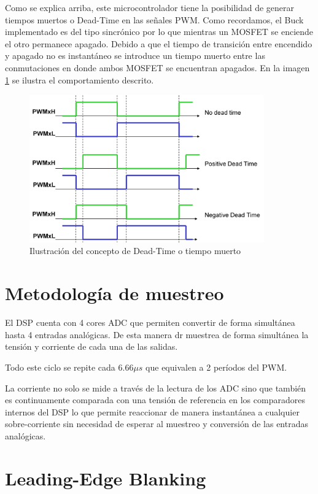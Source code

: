 \documentclass[12pt]{report}
\begin{document}
Como se explica arriba, este microcontrolador tiene la posibilidad de generar tiempos muertos o Dead-Time en las señales PWM. Como recordamos, el Buck implementado es del tipo sincrónico por lo que mientras un MOSFET se enciende el otro permanece apagado. Debido a que el tiempo de transición entre encendido y apagado no es instantáneo se introduce un tiempo muerto entre las conmutaciones en donde ambos MOSFET se encuentran apagados. En la imagen \ref{deadtime} se ilustra el comportamiento descrito.

\begin{figure}[H]
	\centering
	\includegraphics[width=0.9\textwidth,height=\textheight,keepaspectratio]{deadtime}
	\caption{Ilustración del concepto de Dead-Time o tiempo muerto}
	\label{deadtime}
\end{figure}

\section{Metodología de muestreo}

El DSP cuenta con 4 cores ADC que permiten convertir de forma simultánea hasta 4 entradas analógicas. De esta manera dr muestrea de forma simultánea la tensión y corriente de cada una de las salidas.

Todo este ciclo se repite cada $6.66 \mu s$ que equivalen a 2 períodos del PWM.

La corriente no solo se mide a través de la lectura de los ADC sino que también es continuamente comparada con una tensión de referencia en los comparadores internos del DSP lo que permite reaccionar de manera instantánea a cualquier sobre-corriente sin necesidad de esperar al muestreo y conversión de las entradas analógicas.

\section{Leading-Edge Blanking}
\end{document}
